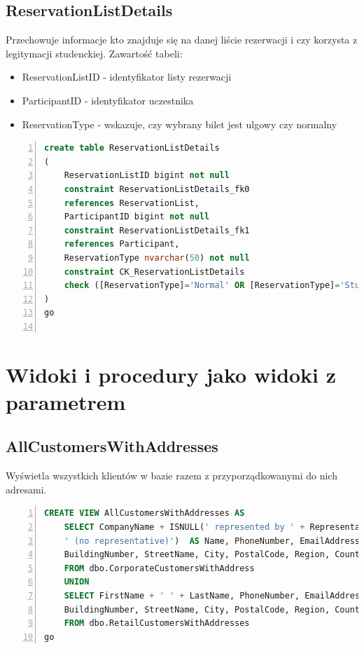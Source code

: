 \documentclass[]{article}
\begin{document}
	\subsection{ReservationListDetails}
	Przechowuje informacje kto znajduje się na danej liście rezerwacji i czy korzysta z legitymacji studenckiej. Zawartość tabeli:
	\begin{itemize}
		\item ReservationListID - identyfikator listy rezerwacji
		\item ParticipantID - identyfikator uczestnika
		\item ReservationType - wskazuje, czy wybrany bilet jest ulgowy czy normalny
	\end{itemize}
	\begin{lstlisting}[language=SQL,
						showspaces=false,
						basicstyle=\ttfamily,
						numbers=left,
						numberstyle=\tiny,
						backgroundcolor=\color{lightg},
						keywordstyle=\color{lightblue},
						commentstyle=\color{gray}]
create table ReservationListDetails
(
	ReservationListID bigint not null
	constraint ReservationListDetails_fk0
	references ReservationList,
	ParticipantID bigint not null
	constraint ReservationListDetails_fk1
	references Participant,
	ReservationType nvarchar(50) not null
	constraint CK_ReservationListDetails
	check ([ReservationType]='Normal' OR [ReservationType]='Student')
)
go
	
	\end{lstlisting}
	
	
\section{Widoki i procedury jako widoki z parametrem}
	\subsection{AllCustomersWithAddresses}
	Wyświetla wszystkich klientów w bazie razem z przyporządkowanymi do nich adresami.
	\begin{lstlisting}[language=SQL,
						showspaces=false,
						basicstyle=\ttfamily,
						numbers=left,
						numberstyle=\tiny,
						backgroundcolor=\color{lightg},
						keywordstyle=\color{lightblue},
						commentstyle=\color{gray}]
CREATE VIEW AllCustomersWithAddresses AS
	SELECT CompanyName + ISNULL(' represented by ' + RepresentativeName,
	' (no representative)')  AS Name, PhoneNumber, EmailAddress,
	BuildingNumber, StreetName, City, PostalCode, Region, Country, Notes
	FROM dbo.CorporateCustomersWithAddress
	UNION
	SELECT FirstName + ' ' + LastName, PhoneNumber, EmailAddress,
	BuildingNumber, StreetName, City, PostalCode, Region, Country, Notes
	FROM dbo.RetailCustomersWithAddresses
go
	\end{lstlisting}
	
\end{document}
